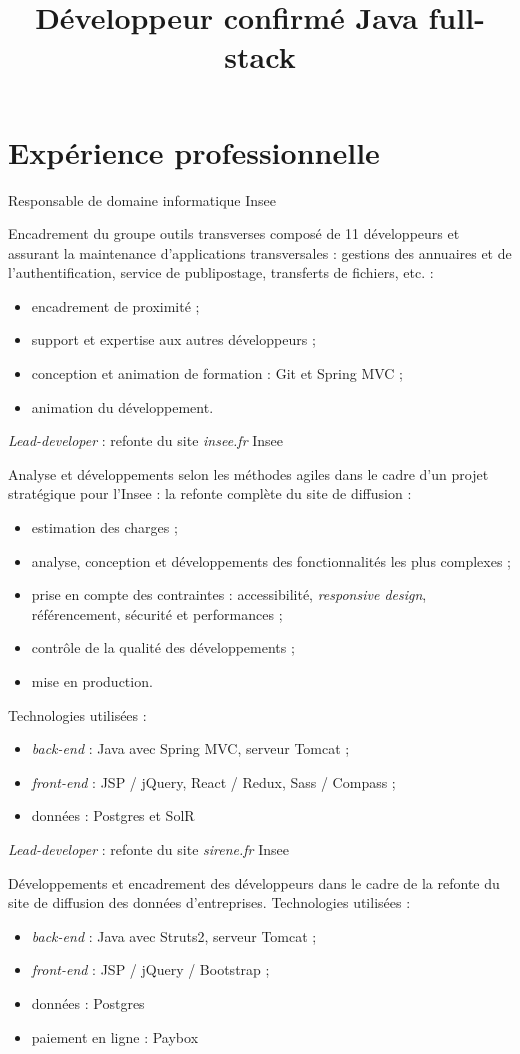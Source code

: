 \documentclass[11pt,a4paper,roman]{moderncv}       %
\title{Développeur confirmé Java full-stack}
\begin{document}
\makecvtitle



\section{Expérience professionnelle}\label{sec:expérience-professionnelle}

{Responsable de domaine informatique}
{Insee}
{}
{}
{Encadrement du groupe \og outils transverses \fg composé de 11 développeurs et assurant la maintenance d'applications transversales : gestions des annuaires et de l'authentification, service de publipostage, transferts de fichiers, etc. :
\begin{itemize}%
  \item encadrement de proximité ;
  \item support et expertise aux autres développeurs ;
  \item conception et animation de formation : Git et Spring MVC ;
  \item animation du développement.
\end{itemize}}

{\emph{Lead-developer} : refonte du site \emph{insee.fr}}
{Insee}
{}
{}
{Analyse et développements selon les méthodes agiles dans le cadre d'un projet stratégique pour l'Insee : la refonte complète du site de diffusion :
\begin{itemize}%
  \item estimation des charges ;
  \item analyse, conception et développements des fonctionnalités les plus complexes ;
  \item prise en compte des contraintes : accessibilité, \emph{responsive design}, référencement,  sécurité et performances ;
  \item contrôle de la qualité des développements ;
  \item mise en production.
\end{itemize}%
Technologies utilisées :
\begin{itemize}%
  \item \emph{back-end} : Java avec Spring MVC, serveur Tomcat ;
  \item \emph{front-end} : JSP / jQuery, React / Redux, Sass / Compass ;
  \item données : Postgres et SolR
\end{itemize}}

{\emph{Lead-developer} : refonte du site \emph{sirene.fr}}
{Insee}
{}
{}
{Développements et encadrement des développeurs dans le cadre de la refonte du site de diffusion des données d'entreprises.
\newline Technologies utilisées :
\begin{itemize}%
  \item \emph{back-end} : Java avec Struts2, serveur Tomcat ;
  \item \emph{front-end} : JSP / jQuery / Bootstrap ;
  \item données : Postgres
  \item paiement en ligne : Paybox
\end{itemize}}
\end{document}
